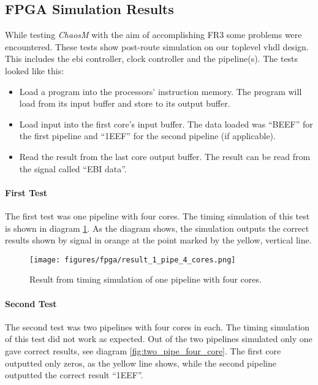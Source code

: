 
\subsection{FPGA Simulation Results}
While testing \textit{ChaosM} with the aim of accomplishing FR3 
some problems were encountered. These tests show post-route simulation on our 
toplevel vhdl design. This includes the ebi controller, clock controller and the pipeline(s). 
The tests looked like this:

\begin{itemize}
\item Load a program into the processors’ instruction memory. The program will load from its input buffer and store to its output buffer.\\
\item Load input into the first core’s input buffer. The data loaded was “BEEF” for the first pipeline and “1EEF” for the second pipeline (if applicable).\\
\item Read the result from the last core output buffer. The result can be read from the signal called “EBI data”.\\
\end{itemize}


\paragraph{First Test}
The first test was one pipeline with four cores. The timing simulation of this test is
 shown in diagram \ref{fig:one_pipe_four_core}. As the diagram shows, 
 the simulation outputs the correct results shown by signal in orange at the point 
 marked by the yellow, vertical line. 
 
 \begin{figure}[H]
    \centering
    \texttt{[image: figures/fpga/result\_1\_pipe\_4\_cores.png]}
    \caption{Result from timing simulation of one pipeline with four cores.}
    \label{fig:one_pipe_four_core}
\end{figure}

\paragraph{Second Test}
The second test was two pipelines with four cores in each. The timing simulation 
of this test did not work as expected. Out of the two pipelines simulated only one 
gave correct results, see diagram \ref{fig:two_pipe_four_core}. The first core 
outputted only zeros, as the yellow line shows,  while the second pipeline outputted the correct result “1EEF”. 

